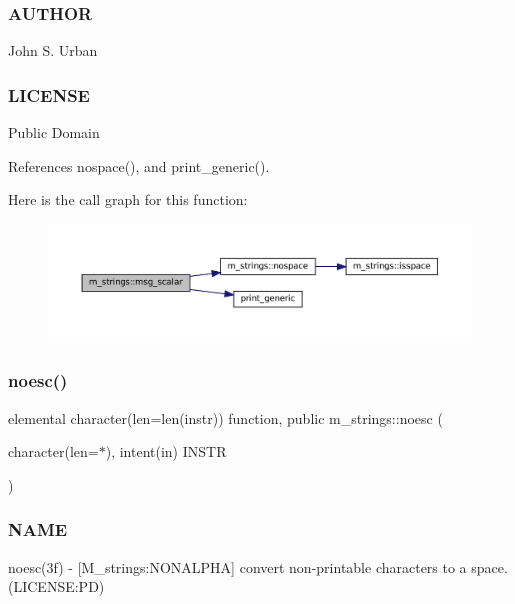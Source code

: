\subsubsection*{A\+U\+T\+H\+OR}

John S. Urban \subsubsection*{L\+I\+C\+E\+N\+SE}

Public Domain 

References nospace(), and print\+\_\+generic().

Here is the call graph for this function\+:\nopagebreak
\begin{figure}[H]
\begin{center}
\leavevmode
\includegraphics[width=350pt]{namespacem__strings_a926d1d9f529487149f4e0a1de8294122_cgraph}
\end{center}
\end{figure}
\mbox{\label{namespacem__strings_a5d72fde097444c689f1822c5ad95e03d}} 
\subsubsection{\texorpdfstring{noesc()}{noesc()}}
{\footnotesize\ttfamily elemental character(len=len(instr)) function, public m\+\_\+strings\+::noesc (\begin{DoxyParamCaption}\item[{character(len=$\ast$), intent(in)}]{I\+N\+S\+TR }\end{DoxyParamCaption})}



\subsubsection*{N\+A\+ME}

noesc(3f) -\/ \mbox{[}M\+\_\+strings\+:N\+O\+N\+A\+L\+P\+HA\mbox{]} convert non-\/printable characters to a space. (L\+I\+C\+E\+N\+SE\+:PD) 

